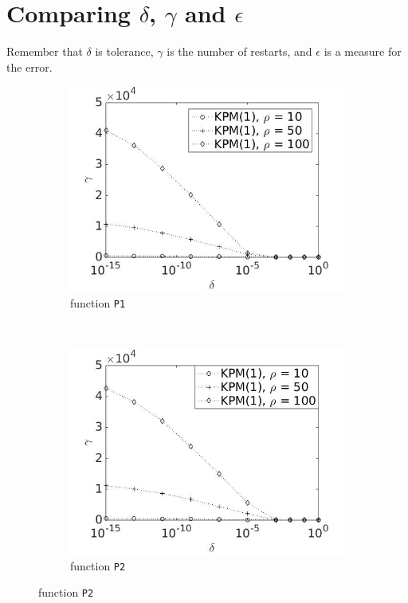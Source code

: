 \section{Comparing $\delta$, $\gamma$ and $\epsilon$ } \label{sec:div}
Remember that $\delta$ is tolerance, $\gamma$ is the number of restarts, and $\epsilon$ is a measure for the error.
\begin{figure}[H]
        \centering
        \begin{subfigure}[b]{0.45\textwidth}
                \includegraphics[width=\textwidth]{fig/s13antvstol1m}
                \caption{function \texttt{P1}}
                \label{fig:gammadelta1}
        \end{subfigure}
~
        \begin{subfigure}[b]{0.45\textwidth}
                \includegraphics[width=\textwidth]{fig/s14antvstol2m}
                \caption{ function \texttt{P2}}
                \label{fig:gammadelta2}
        \end{subfigure}
        

\end{figure}
